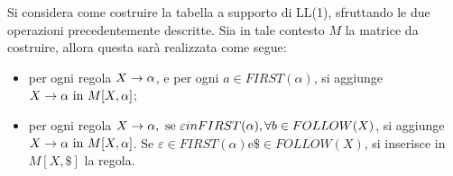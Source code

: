 \documentclass{subfiles}
\begin{document}
Si considera come costruire la tabella a supporto di LL(1), sfruttando le due operazioni precedentemente descritte.
Sia in tale contesto $M$ la matrice da costruire, allora questa sarà realizzata come segue:
\begin{itemize}
    \item per ogni regola $\Grammar{X}{\alpha}$, e per ogni $a \in FIRST(\alpha)$, si aggiunge $\Grammar{X}{\alpha} \text{in} M[X, \alpha]$;
    \item per ogni regola $\Grammar{X}{\alpha}, \text{se} \varepsilon in FIRST(\alpha), \forall b \in FOLLOW(X)$,
          si aggiunge $\Grammar{X}{\alpha} \text{in} M[X, \alpha]$.
          Se $\varepsilon \in FIRST(\alpha) \text{e} \$ \in FOLLOW(X)$, si inserisce in $M[X, \$]$ la regola.
\end{itemize}
\end{document}
